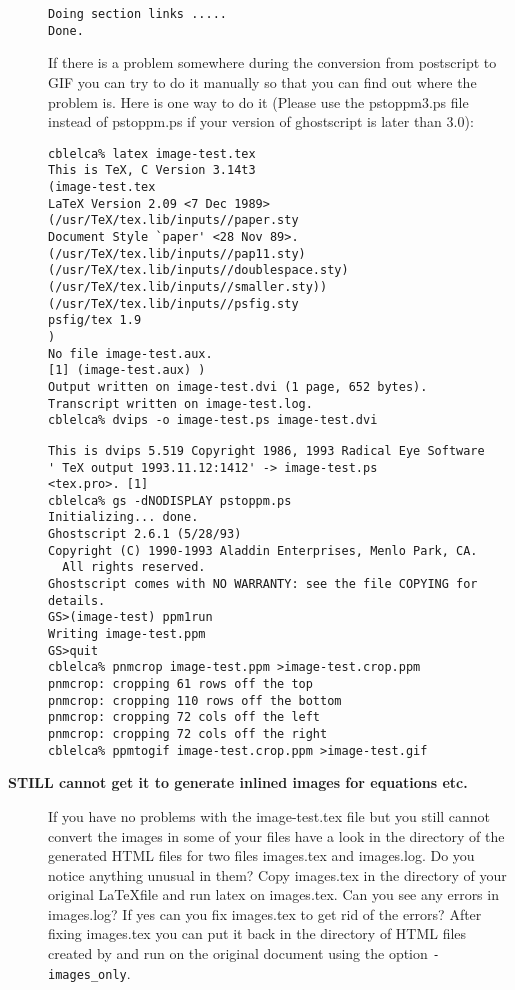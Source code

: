 \begin{description}
\begin{verbatim}
Doing section links .....
Done.
\end{verbatim}


If there is a problem somewhere during the conversion from postscript
to GIF you can try to do it manually so that you can find out where
the problem is. Here is one way to do it (Please use the {\fn pstoppm3.ps}
file instead of {\fn pstoppm.ps} if your version of ghostscript is
later than 3.0):

\begin{verbatim}
cblelca% latex image-test.tex
This is TeX, C Version 3.14t3
(image-test.tex
LaTeX Version 2.09 <7 Dec 1989>
(/usr/TeX/tex.lib/inputs//paper.sty
Document Style `paper' <28 Nov 89>.
(/usr/TeX/tex.lib/inputs//pap11.sty) (/usr/TeX/tex.lib/inputs//doublespace.sty)
(/usr/TeX/tex.lib/inputs//smaller.sty)) (/usr/TeX/tex.lib/inputs//psfig.sty
psfig/tex 1.9
)
No file image-test.aux.
[1] (image-test.aux) )
Output written on image-test.dvi (1 page, 652 bytes).
Transcript written on image-test.log.
cblelca% dvips -o image-test.ps image-test.dvi
\end{verbatim}
\begin{verbatim}
This is dvips 5.519 Copyright 1986, 1993 Radical Eye Software
' TeX output 1993.11.12:1412' -> image-test.ps
<tex.pro>. [1] 
cblelca% gs -dNODISPLAY pstoppm.ps
Initializing... done.
Ghostscript 2.6.1 (5/28/93)
Copyright (C) 1990-1993 Aladdin Enterprises, Menlo Park, CA.
  All rights reserved.
Ghostscript comes with NO WARRANTY: see the file COPYING for details.
GS>(image-test) ppm1run 
Writing image-test.ppm
GS>quit
cblelca% pnmcrop image-test.ppm >image-test.crop.ppm
pnmcrop: cropping 61 rows off the top
pnmcrop: cropping 110 rows off the bottom
pnmcrop: cropping 72 cols off the left
pnmcrop: cropping 72 cols off the right
cblelca% ppmtogif image-test.crop.ppm >image-test.gif
\end{verbatim}

\item [{\bf STILL cannot get it to generate inlined images for equations
etc.}]
If you have no problems with the {\fn image-test.tex} file but you
still cannot convert the images in some of your files 
have a look in the directory of the generated
HTML files for two files {\fn images.tex} and {\fn images.log}. Do you notice
anything unusual in them? Copy {\fn images.tex} in the directory 
of your original \LaTeX file and run {\fn latex} on {\fn images.tex}.
Can you see any errors in {\fn images.log}? If yes can you fix
{\fn images.tex} to get rid of the errors? After fixing {\fn
images.tex}
you can put it back in the directory of HTML files created by
\latextohtml and run \latextohtml on the original document 
using the option {\tt -images\_only}. 


\end{description}
